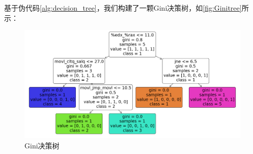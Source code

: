 基于伪代码\autoref{alg:decision_tree}，我们构建了一颗Gini决策树，如\autoref{fig:Ginitree}所示：
\begin{figure}[H]
    \centering
    \includegraphics[width=1\linewidth]{figures/Ginitree.png}
    \caption{Gini决策树}
    \label{fig:Ginitree}
\end{figure}
